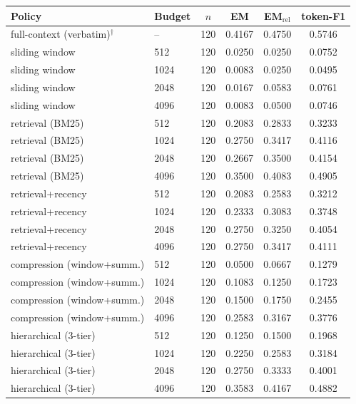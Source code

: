 \begin{tabular}{llcccc}
\toprule
Policy & Budget & $n$ & EM & EM$_{\text{rel}}$ & token-F1 \\
\midrule
full-context (verbatim)$^{\dagger}$ & -- & 120 & 0.4167 & 0.4750 & 0.5746 \\
sliding window & 512 & 120 & 0.0250 & 0.0250 & 0.0752 \\
sliding window & 1024 & 120 & 0.0083 & 0.0250 & 0.0495 \\
sliding window & 2048 & 120 & 0.0167 & 0.0583 & 0.0761 \\
sliding window & 4096 & 120 & 0.0083 & 0.0500 & 0.0746 \\
retrieval (BM25) & 512 & 120 & 0.2083 & 0.2833 & 0.3233 \\
retrieval (BM25) & 1024 & 120 & 0.2750 & 0.3417 & 0.4116 \\
retrieval (BM25) & 2048 & 120 & 0.2667 & 0.3500 & 0.4154 \\
retrieval (BM25) & 4096 & 120 & 0.3500 & 0.4083 & 0.4905 \\
retrieval+recency & 512 & 120 & 0.2083 & 0.2583 & 0.3212 \\
retrieval+recency & 1024 & 120 & 0.2333 & 0.3083 & 0.3748 \\
retrieval+recency & 2048 & 120 & 0.2750 & 0.3250 & 0.4054 \\
retrieval+recency & 4096 & 120 & 0.2750 & 0.3417 & 0.4111 \\
compression (window+summ.) & 512 & 120 & 0.0500 & 0.0667 & 0.1279 \\
compression (window+summ.) & 1024 & 120 & 0.1083 & 0.1250 & 0.1723 \\
compression (window+summ.) & 2048 & 120 & 0.1500 & 0.1750 & 0.2455 \\
compression (window+summ.) & 4096 & 120 & 0.2583 & 0.3167 & 0.3776 \\
hierarchical (3-tier) & 512 & 120 & 0.1250 & 0.1500 & 0.1968 \\
hierarchical (3-tier) & 1024 & 120 & 0.2250 & 0.2583 & 0.3184 \\
hierarchical (3-tier) & 2048 & 120 & 0.2750 & 0.3333 & 0.4001 \\
hierarchical (3-tier) & 4096 & 120 & 0.3583 & 0.4167 & 0.4882 \\
\bottomrule
\end{tabular}